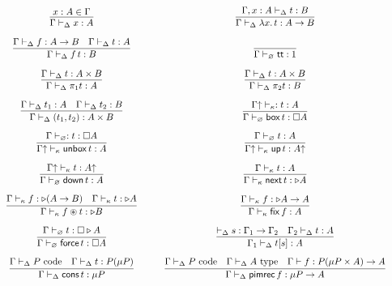 \[\arraycolsep=15pt\def\arraystretch{2.8}
\begin{array}{cc}
\infer{\Gamma \vdash_{\Delta} x : A}{x : A \in \Gamma}
&
\infer{\Gamma \vdash_{\Delta} \lambda x.\, t : A \to B}{\Gamma , x : A \vdash_{\Delta} t : B} 
\\
\infer{\Gamma \vdash_{\Delta} f\,t : B}{\Gamma \vdash_{\Delta} f : A \to B & \Gamma \vdash_{\Delta} t : A}
&
\infer{\Gamma \vdash_{\varnothing} {\mathsf{tt}} : 1}{}
\\
\infer{\Gamma \vdash_{\Delta} \pi_1 t : A}{\Gamma \vdash_{\Delta} t : A \times B}
&
\infer{\Gamma \vdash_{\Delta} \pi_2 t : B}{\Gamma \vdash_{\Delta} t : A \times B}
\\
\infer{\Gamma \vdash_{\Delta} (t_1,t_2) : A \times B}{\Gamma \vdash_{\Delta} t_1 : A & \Gamma \vdash_{\Delta} t_2 : B} 
&
\infer{\Gamma \vdash_{\varnothing} \boxtm\,t : \square A}{\Gamma \up \vdash_{\kappa} : t : A}
\\
\infer{\Gamma \up \vdash_{\kappa} \unboxtm\,t : A}{\Gamma \vdash_{\varnothing} : t : \square A}
&
\infer{\Gamma \up \vdash_{\kappa} \mathsf{up} \,t : A \up}{\Gamma \vdash_{\varnothing} t : A}
\\
\infer {\Gamma \vdash_{\varnothing} \mathsf{down}\,t : A}{\Gamma \up \vdash_{\kappa} t : A \up}
&
\infer{\Gamma \vdash_{\kappa} \next\,t : \later A}{\Gamma \vdash_{\kappa} t : A} 
\\
\infer{\Gamma \vdash_{\kappa} f \circledast t : \later B}{\Gamma \vdash_{\kappa} f : \later (A \to B) & \Gamma \vdash_{\kappa} t : \later A}
&
\infer{\Gamma \vdash_{\kappa} \fix \,f : A}{\Gamma \vdash_{\kappa} f : \later A \to A}
\\
\infer{\Gamma \vdash_{\varnothing} \force\,t : \square A}{\Gamma \vdash_{\varnothing} t : \square \later A}
&
\infer{\Gamma_1 \vdash_{\Delta} t[s] : A}{\vdash_{\Delta} s :  \Gamma_1 \to \Gamma_2 & \Gamma_2 \vdash_{\Delta} t : A}
\\
\infer{\Gamma \vdash_{\Delta} \cons \, t : \mu P}{\Gamma \vdash_{\Delta} P \poly & \Gamma \vdash_{\Delta} t : P(\mu P)}
&
\infer{\Gamma \vdash_{\Delta} \primrec \, f : \mu P \to A}{\Gamma \vdash_{\Delta} P \poly & \Gamma \vdash_{\Delta} A \type & \Gamma \vdash f : P(\mu P \times A) \to A}
\end{array}
\]


%
